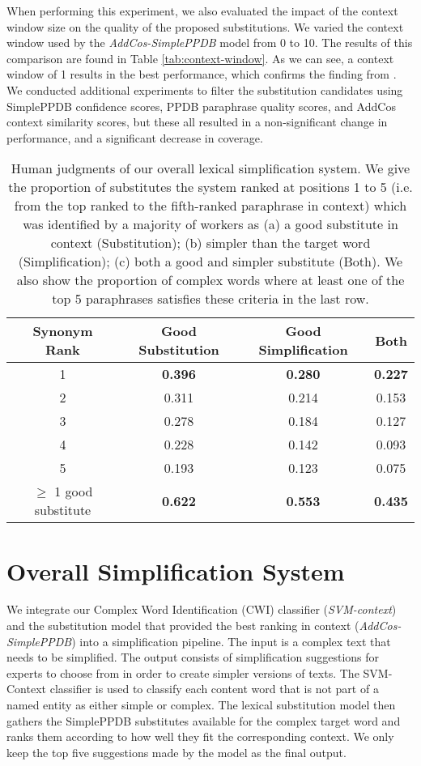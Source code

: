 \documentclass[thesis.tex]{subfiles}
\begin{document}
When performing this experiment, we also evaluated the impact of the context window size on the quality of the proposed substitutions. We varied the context window used by the \textit{AddCos-SimplePPDB} model from 0 to 10. The results of this comparison are found in Table \ref{tab:context-window}. As we can see, a context window of 1 results in the best performance, which confirms the finding from \cite{cocos2017word}. We conducted additional experiments to filter the substitution candidates using SimplePPDB confidence scores, PPDB paraphrase quality scores, and AddCos context similarity scores, but these all resulted in a non-significant change in performance, and a significant decrease in coverage.

\begin{table}
	\centering
	\begin{tabular}{|c|c|c|c|}
		\hline \bf Synonym Rank & \bf Good Substitution & \bf Good Simplification & \bf Both\\ \hline
        1 & \bf 0.396 & \bf 0.280 & \bf 0.227 \\ 
        2 & 0.311 & 0.214 & 0.153 \\ 
        3 & 0.278 & 0.184 & 0.127 \\
        4 & 0.228 & 0.142 & 0.093 \\ 
        5 & 0.193 & 0.123 & 0.075 \\ \hline \hline
        $\geq$ 1 good substitute & \bf 0.622 & \bf 0.553 & \bf 0.435 \\ \hline
	\end{tabular}
	\caption{Human judgments of our overall lexical simplification system. We give the proportion of substitutes the system ranked at positions 1 to 5 (i.e. from the top ranked to the fifth-ranked paraphrase in context) which was identified by a majority of workers as (a) a good substitute in context (Substitution); (b) simpler than the target word (Simplification); (c) both a good and simpler substitute (Both). We also show the proportion of complex words where at least one of the top 5 paraphrases satisfies these criteria in the last row.
    }
	\label{tab:lexical_overall}
\end{table}

\section{Overall Simplification System}

We integrate our Complex Word Identification (CWI) classifier (\textit{SVM-context}) and the substitution model that provided the best ranking in context (\textit{AddCos-SimplePPDB}) into a simplification pipeline. The input is a complex text that needs to be simplified. The output consists of simplification suggestions for experts to choose from in order to create simpler versions of texts. The SVM-Context classifier is used to classify each content word that is not part of a named entity as either simple or complex. The lexical substitution model then gathers the SimplePPDB substitutes available for the complex target word and ranks them according to how well they fit the corresponding context. We only keep the top five suggestions made by the model as the final output.
\end{document}
